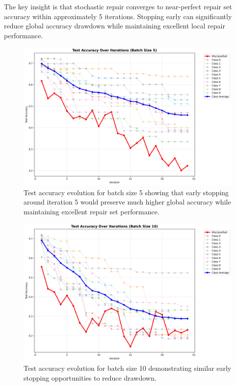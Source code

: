 \documentclass{article}
\begin{document}
The key insight is that stochastic repair converges to near-perfect repair set accuracy within approximately 5 iterations. Stopping early can significantly reduce global accuracy drawdown while maintaining excellent local repair performance.

\begin{figure}[h]
	\centering
	\includegraphics[width=\textwidth]{results/stochastic_analysis/batch_iterations/test_accuracy_batch_5.png}
	\caption{Test accuracy evolution for batch size 5 showing that early stopping around iteration 5 would preserve much higher global accuracy while maintaining excellent repair set performance.}
	\label{fig:early_stopping_batch_5}
\end{figure}

\begin{figure}[h]
	\centering
	\includegraphics[width=\textwidth]{results/stochastic_analysis/batch_iterations/test_accuracy_batch_10.png}
	\caption{Test accuracy evolution for batch size 10 demonstrating similar early stopping opportunities to reduce drawdown.}
	\label{fig:early_stopping_batch_10}
\end{figure}
\end{document}
